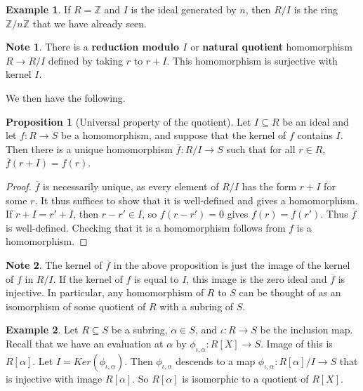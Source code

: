 \documentclass{article}
\newcommand{\Z}{\mathbb{Z}}
\newcommand{\rb}[1]{\left( #1 \right)}
\renewcommand{\sb}[1]{\left[ #1 \right]}
\theoremstyle{definition}\newtheorem{definition}{Definition}[section]
\theoremstyle{definition}\newtheorem{remark}[definition]{Remark}
\theoremstyle{definition}\newtheorem*{example}{Example}
\theoremstyle{definition}\newtheorem*{note}{Note}
\newtheorem{proposition}[definition]{Proposition}
\begin{document}
\begin{example}
If $ R = \Z $ and $ I $ is the ideal generated by $ n $, then $ R / I $ is the ring $ \Z / n\Z $ that we have already seen.
\end{example}

\begin{note}
There is a \textbf{reduction modulo $ I $} or \textbf{natural quotient} homomorphism $ R \to R / I $ defined by taking $ r $ to $ r + I $. This homomorphism is surjective with kernel $ I $.
\end{note}

We then have the following.

\begin{proposition}[Universal property of the quotient]
Let $ I \subseteq R $ be an ideal and let $ f : R \to S $ be a homomorphism, and suppose that the kernel of $ f $ contains $ I $. Then there is a unique homomorphism $ \overline{f} : R / I \to S $ such that for all $ r \in R $, $ \overline{f}\rb{r + I} = f\rb{r} $.
\end{proposition}

\begin{proof}
$ \overline{f} $ is necessarily unique, as every element of $ R / I $ has the form $ r + I $ for some $ r $. It thus suffices to show that it is well-defined and gives a homomorphism. If $ r + I = r' + I $, then $ r - r' \in I $, so $ f\rb{r - r'} = 0 $ gives $ f\rb{r} = f\rb{r'} $. Thus $ \overline{f} $ is well-defined. Checking that it is a homomorphism follows from $ f $ is a homomorphism.
\end{proof}

\begin{note}
The kernel of $ \overline{f} $ in the above proposition is just the image of the kernel of $ f $ in $ R / I $. If the kernel of $ f $ is equal to $ I $, this image is the zero ideal and $ \overline{f} $ is injective. In particular, any homomorphism of $ R $ to $ S $ can be thought of as an isomorphism of some quotient of $ R $ with a subring of $ S $.
\end{note}

\begin{example}
Let $ R \subseteq S $ be a subring, $ \alpha \in S $, and $ \iota : R \to S $ be the inclusion map. Recall that we have an evaluation at $ \alpha $ by $ \phi_{\iota, \alpha} : R\sb{X} \to S $. Image of this is $ R\sb{\alpha} $. Let $ I = Ker\rb{\phi_{\iota, \alpha}} $. Then $ \phi_{\iota, \alpha} $ descends to a map $ \phi_{\iota, \alpha} : R\sb{\alpha} / I \to S $ that is injective with image $ R\sb{\alpha} $. So $ R\sb{\alpha} $ is isomorphic to a quotient of $ R\sb{X} $.
\end{example}
\end{document}
